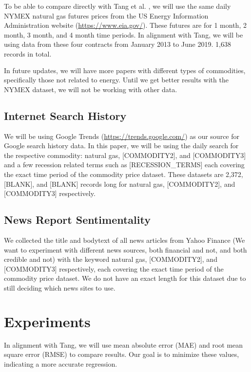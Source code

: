 \documentclass[final]{cvpr}
\begin{document}
    To be able to compare directly with Tang et al. \cite{tang}, we will use the
    same daily NYMEX natural gas futures prices from the US Energy Information
    Administration website (\url{https://www.eia.gov/}). These futures are for 1
    month, 2 month, 3 month, and 4 month time periods. In alignment with Tang,
    we will be using data from these four contracts from January 2013 to June
    2019. 1,638 records in total.

    In future updates, we will have more papers with different types of
    commodities, specifically those not related to energy. Until we get better
    results with the NYMEX dataset, we will not be working with other data.

\subsection{Internet Search History}

    We will be using Google Trends (\url{https://trends.google.com/}) as our
    source for Google search history data.  In this paper, we will be using the
    daily search for the respective commodity: natural gas, [COMMODITY2], and
    [COMMODITY3] and a few recession related terms such as [RECESSION\_TERMS]
    each covering the exact time period of the commodity price dataset. These
    datasets are 2,372, [BLANK], and [BLANK] records long for natural gas,
    [COMMODITY2], and [COMMODITY3] respectively.

\subsection{News Report Sentimentality}

    We collected the title and bodytext of all news articles from Yahoo Finance
    (We want to experiment with different news sources, both financial and not,
    and both credible and not) with the keyword natural gas, [COMMODITY2], and 
    [COMMODITY3] respectively, each covering the exact time period of the
    commodity price dataset. We do not have an exact length for this dataset due
    to still deciding which news sites to use.

\section{Experiments}

    In alignment with Tang, we will use mean absolute error (MAE) and root mean
    square error (RMSE) to compare results. Our goal is to minimize these
    values, indicating a more accurate regression.
\end{document}
